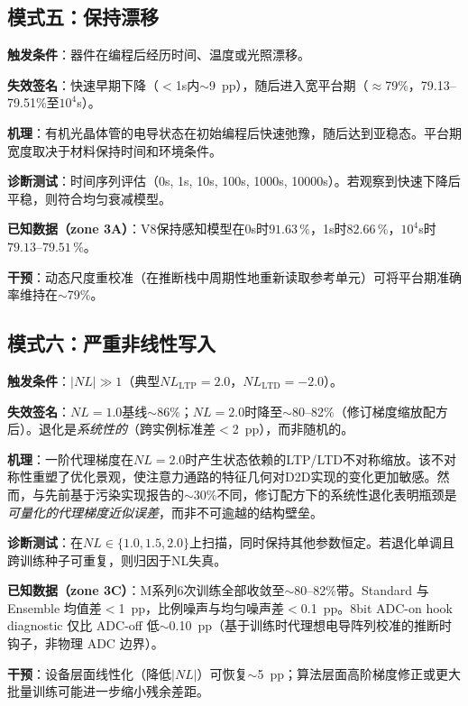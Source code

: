 \subsection{模式五：保持漂移}
\label{subsec:failure_retention}

\textbf{触发条件}：器件在编程后经历时间、温度或光照漂移。

\textbf{失效签名}：快速早期下降（$<$1s内$\sim$9~pp），随后进入宽平台期（$\approx$79\%，79.13--79.51\%至$10^4$s）。

\textbf{机理}：有机光晶体管的电导状态在初始编程后快速弛豫，随后达到亚稳态。平台期宽度取决于材料保持时间和环境条件。

\textbf{诊断测试}：时间序列评估（0s, 1s, 10s, 100s, 1000s, 10000s）。若观察到快速下降后平稳，则符合均匀衰减模型。

\textbf{已知数据（zone 3A）}：V8保持感知模型在0s时$91.63\,\%$，1s时$82.66\,\%$，$10^4$s时$79.13$--$79.51\,\%$。

\textbf{干预}：动态尺度重校准（在推断栈中周期性地重新读取参考单元）可将平台期准确率维持在$\sim$79\%。

\subsection{模式六：严重非线性写入}
\label{subsec:failure_severe_nl}

\textbf{触发条件}：$|NL|\gg1$（典型$NL_{\mathrm{LTP}}=2.0$，$NL_{\mathrm{LTD}}=-2.0$）。

\textbf{失效签名}：$NL=1.0$基线$\sim$86\%；$NL=2.0$时降至$\sim$80--82\%（修订梯度缩放配方后）。退化是\emph{系统性的}（跨实例标准差$<$2~pp），而非随机的。

\textbf{机理}：一阶代理梯度在$NL=2.0$时产生状态依赖的LTP/LTD不对称缩放。该不对称性重塑了优化景观，使注意力通路的特征几何对D2D实现的变化更加敏感。然而，与先前基于污染实现报告的$\sim$30\%不同，修订配方下的系统性退化表明瓶颈是\emph{可量化的代理梯度近似误差}，而非不可逾越的结构壁垒。

\textbf{诊断测试}：在$NL\in\{1.0, 1.5, 2.0\}$上扫描，同时保持其他参数恒定。若退化单调且跨训练种子可重复，则归因于NL失真。

\textbf{已知数据（zone 3C）}：M系列6次训练全部收敛至$\sim$80--82\%带。Standard 与 Ensemble 均值差$<$1~pp，比例噪声与均匀噪声差$<$0.1~pp。8bit ADC-on hook diagnostic 仅比 ADC-off 低$\sim$0.10~pp（基于训练时代理想电导阵列校准的推断时钩子，非物理 ADC 边界）。

\textbf{干预}：设备层面线性化（降低$|NL|$）可恢复$\sim$5~pp；算法层面高阶梯度修正或更大批量训练可能进一步缩小残余差距。

